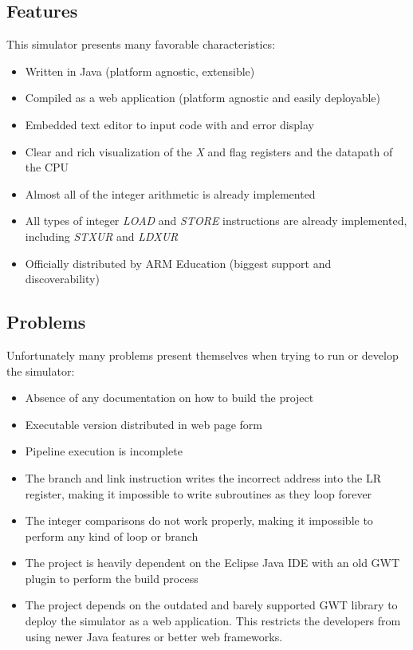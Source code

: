 \subsection*{Features}

This simulator presents many favorable characteristics:

\begin{itemize}[label=\textendash]
	\item Written in Java (platform agnostic, extensible)
	\item Compiled as a web application (platform agnostic and easily deployable)
	\item Embedded text editor to input code with and error display
	\item Clear and rich visualization of the \emph{X} and flag registers and the datapath of the CPU
	\item Almost all of the integer arithmetic is already implemented
	\item All types of integer \emph{LOAD} and \emph{STORE} instructions are already implemented, including \emph{STXUR} and \emph{LDXUR}
	\item Officially distributed by ARM Education (biggest support and discoverability)
\end{itemize}


\subsection*{Problems}

Unfortunately many problems present themselves when trying to run or develop the simulator:

\begin{itemize}[label=\textendash]
	\item Absence of any documentation on how to build the project
	\item Executable version distributed in web page form
	\item Pipeline execution is incomplete
	\item The branch and link instruction writes the incorrect address into the LR register, making it impossible to write subroutines as they loop forever
	\item The integer comparisons do not work properly, making it impossible to perform any kind of loop or branch
	\item The project is heavily dependent on the Eclipse Java IDE with an old GWT plugin to perform the build process
	\item The project depends on the outdated and barely supported GWT library to deploy the simulator as a web application. This restricts the developers from using newer Java features or better web frameworks.
\end{itemize}


